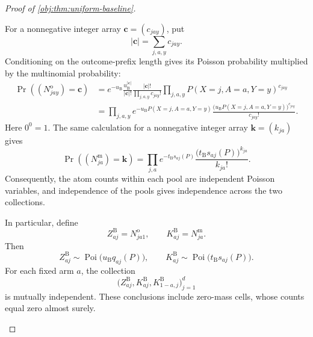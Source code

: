 \begin{proof}[Proof of \cref{obj:thm:uniform-baseline}]
\begin{enumerate}
For a nonnegative integer array
\(\boldsymbol c=(c_{jay})\), put
\[
|\boldsymbol c|=\sum_{j,a,y}c_{jay}.
\]
Conditioning on the outcome-prefix length gives its Poisson probability multiplied by the multinomial probability:
\[
\begin{aligned}
\Pr\!\left((N_{jay}^{\mathrm o})=\boldsymbol c\right)
&=
e^{-u_{\mathrm B}}
\frac{u_{\mathrm B}^{|\boldsymbol c|}}{|\boldsymbol c|!}
\frac{|\boldsymbol c|!}{\prod_{j,a,y}c_{jay}!}
\prod_{j,a,y}
P(X=j,A=a,Y=y)^{c_{jay}}\\
&=
\prod_{j,a,y}
e^{-u_{\mathrm B}P(X=j,A=a,Y=y)}
\frac{
\bigl(u_{\mathrm B}P(X=j,A=a,Y=y)\bigr)^{c_{jay}}
}{c_{jay}!}.
\end{aligned}
\]
Here \(0^0=1\). The same calculation for a nonnegative integer array
\(\boldsymbol k=(k_{ja})\) gives
\[
\Pr\!\left((N_{ja}^{\mathrm m})=\boldsymbol k\right)
=
\prod_{j,a}
e^{-t_{\mathrm B}s_{aj}(P)}
\frac{\bigl(t_{\mathrm B}s_{aj}(P)\bigr)^{k_{ja}}}{k_{ja}!}.
\]
Consequently, the atom counts within each pool are independent Poisson variables, and independence of the pools gives independence across the two collections.

In particular, define
\[
Z_{aj}^{\mathrm B}=N_{ja1}^{\mathrm o},
\qquad
K_{aj}^{\mathrm B}=N_{ja}^{\mathrm m}.
\]
Then
\[
Z_{aj}^{\mathrm B}\sim
\operatorname{Poi}\!\bigl(u_{\mathrm B}q_{aj}(P)\bigr),
\qquad
K_{aj}^{\mathrm B}\sim
\operatorname{Poi}\!\bigl(t_{\mathrm B}s_{aj}(P)\bigr).
\]
For each fixed arm \(a\), the collection
\[
\bigl(Z_{aj}^{\mathrm B},K_{aj}^{\mathrm B},
K_{1-a,j}^{\mathrm B}\bigr)_{j=1}^d
\]
is mutually independent. These conclusions include zero-mass cells, whose counts equal zero almost surely.


\end{enumerate}
\end{proof}
